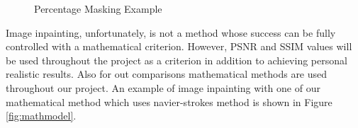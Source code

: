 \begin{figure}[!ht] 
    \centering
        \hspace{0.02\columnwidth}
        \hspace{0.02\columnwidth}
    \vspace*{3mm}
    \caption{Percentage Masking Example}
    \label{fig:percentagemasing}
\end{figure}

Image inpainting, unfortunately, is not a method whose success can be fully controlled with a mathematical criterion. However, PSNR and SSIM values will be used throughout the project as a criterion in addition to achieving personal realistic results. Also for out comparisons mathematical methods are used throughout our project. An example of image inpainting with one of our mathematical method which uses navier-strokes method is shown in Figure \ref{fig:mathmodel}.

